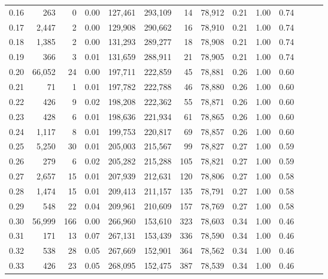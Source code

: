\begin{tabular}{rrrrrrrrrrrrrr}
0.16 &     263 &       0 &  0.00 &  127,461 &  293,109 &      14 &  78,912 &  0.21 &  1.00 &      0.74 \\
0.17 &   2,447 &       2 &  0.00 &  129,908 &  290,662 &      16 &  78,910 &  0.21 &  1.00 &      0.74 \\
0.18 &   1,385 &       2 &  0.00 &  131,293 &  289,277 &      18 &  78,908 &  0.21 &  1.00 &      0.74 \\
0.19 &     366 &       3 &  0.01 &  131,659 &  288,911 &      21 &  78,905 &  0.21 &  1.00 &      0.74 \\
0.20 &  66,052 &      24 &  0.00 &  197,711 &  222,859 &      45 &  78,881 &  0.26 &  1.00 &      0.60 \\
0.21 &      71 &       1 &  0.01 &  197,782 &  222,788 &      46 &  78,880 &  0.26 &  1.00 &      0.60 \\
0.22 &     426 &       9 &  0.02 &  198,208 &  222,362 &      55 &  78,871 &  0.26 &  1.00 &      0.60 \\
0.23 &     428 &       6 &  0.01 &  198,636 &  221,934 &      61 &  78,865 &  0.26 &  1.00 &      0.60 \\
0.24 &   1,117 &       8 &  0.01 &  199,753 &  220,817 &      69 &  78,857 &  0.26 &  1.00 &      0.60 \\
0.25 &   5,250 &      30 &  0.01 &  205,003 &  215,567 &      99 &  78,827 &  0.27 &  1.00 &      0.59 \\
0.26 &     279 &       6 &  0.02 &  205,282 &  215,288 &     105 &  78,821 &  0.27 &  1.00 &      0.59 \\
0.27 &   2,657 &      15 &  0.01 &  207,939 &  212,631 &     120 &  78,806 &  0.27 &  1.00 &      0.58 \\
0.28 &   1,474 &      15 &  0.01 &  209,413 &  211,157 &     135 &  78,791 &  0.27 &  1.00 &      0.58 \\
0.29 &     548 &      22 &  0.04 &  209,961 &  210,609 &     157 &  78,769 &  0.27 &  1.00 &      0.58 \\
0.30 &  56,999 &     166 &  0.00 &  266,960 &  153,610 &     323 &  78,603 &  0.34 &  1.00 &      0.46 \\
0.31 &     171 &      13 &  0.07 &  267,131 &  153,439 &     336 &  78,590 &  0.34 &  1.00 &      0.46 \\
0.32 &     538 &      28 &  0.05 &  267,669 &  152,901 &     364 &  78,562 &  0.34 &  1.00 &      0.46 \\
0.33 &     426 &      23 &  0.05 &  268,095 &  152,475 &     387 &  78,539 &  0.34 &  1.00 &      0.46 \\

\end{tabular}
